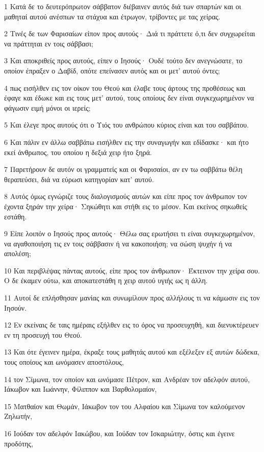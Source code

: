 \par 1 Κατά δε το δευτερόπρωτον σάββατον διέβαινεν αυτός διά των σπαρτών και οι μαθηταί αυτού ανέσπων τα στάχυα και έτρωγον, τρίβοντες με τας χείρας.
\par 2 Τινές δε των Φαρισαίων είπον προς αυτούς· Διά τι πράττετε ό,τι δεν συγχωρείται να πράττηται εν τοις σάββασι;
\par 3 Και αποκριθείς προς αυτούς, είπεν ο Ιησούς· Ουδέ τούτο δεν ανεγνώσατε, το οποίον έπραξεν ο Δαβίδ, οπότε επείνασεν αυτός και οι μετ' αυτού όντες;
\par 4 πως εισήλθεν εις τον οίκον του Θεού και έλαβε τους άρτους της προθέσεως και έφαγε και έδωκε και εις τους μετ' αυτού, τους οποίους δεν είναι συγκεχωρημένον να φάγωσιν ειμή μόνοι οι ιερείς;
\par 5 Και έλεγε προς αυτούς ότι ο Υιός του ανθρώπου κύριος είναι και του σαββάτου.
\par 6 Και πάλιν εν άλλω σαββάτω εισήλθεν εις την συναγωγήν και εδίδασκε· και ήτο εκεί άνθρωπος, του οποίου η δεξιά χειρ ήτο ξηρά.
\par 7 Παρετήρουν δε αυτόν οι γραμματείς και οι Φαρισαίοι, αν εν τω σαββάτω θέλη θεραπεύσει, διά να εύρωσι κατηγορίαν κατ' αυτού.
\par 8 Αυτός όμως εγνώριζε τους διαλογισμούς αυτών και είπε προς τον άνθρωπον τον έχοντα ξηράν την χείρα· Σηκώθητι και στήθι εις το μέσον. Και εκείνος σηκωθείς εστάθη.
\par 9 Είπε λοιπόν ο Ιησούς προς αυτούς· Θέλω σας ερωτήσει τι είναι συγκεχωρημένον, να αγαθοποιήση τις εν τοις σάββασιν ή να κακοποιήση; να σώση ψυχήν ή να απολέση;
\par 10 Και περιβλέψας πάντας αυτούς, είπε προς τον άνθρωπον· Έκτεινον την χείρα σου. Ο δε έκαμεν ούτω, και αποκατεστάθη η χειρ αυτού υγιής ως η άλλη.
\par 11 Αυτοί δε επλήσθησαν μανίας και συνωμίλουν προς αλλήλους τι να κάμωσιν εις τον Ιησούν.
\par 12 Εν εκείναις δε ταις ημέραις εξήλθεν εις το όρος να προσευχηθή, και διενυκτέρευεν εν τη προσευχή του Θεού.
\par 13 Και ότε έγεινεν ημέρα, έκραξε τους μαθητάς αυτού και εξέλεξεν εξ αυτών δώδεκα, τους οποίους και ωνόμασεν αποστόλους,
\par 14 τον Σίμωνα, τον οποίον και ωνόμασε Πέτρον, και Ανδρέαν τον αδελφόν αυτού, Ιάκωβον και Ιωάννην, Φίλιππον και Βαρθολομαίον,
\par 15 Ματθαίον και Θωμάν, Ιάκωβον τον του Αλφαίου και Σίμωνα τον καλούμενον Ζηλωτήν,
\par 16 Ιούδαν τον αδελφόν Ιακώβου, και Ιούδαν τον Ισκαριώτην, όστις και έγεινε προδότης,
